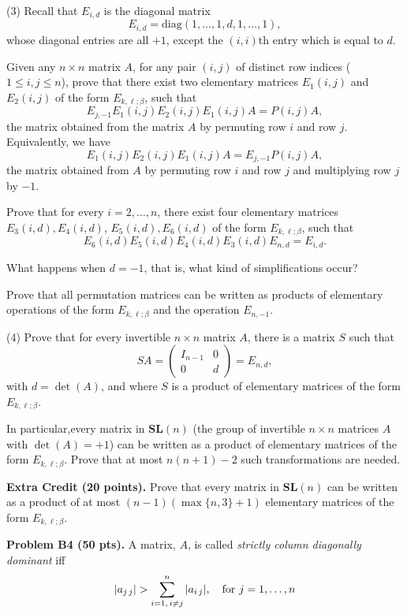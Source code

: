 \documentclass[12pt]{article}
\begin{document}
\medskip
(3)
Recall that $E_{i, d}$ is  the diagonal matrix
\[
E_{i, d} = \mathrm{diag}(1,\ldots, 1, d, 1, \ldots,  1),
\]
whose diagonal entries are all $+1$, except the $(i, i)$th entry which
is equal to $d$.

\medskip
Given any $n\times n$ matrix $A$, for any pair $(i, j)$ of distinct
row indices ($1 \leq i, j \leq n$), 
prove that there exist two elementary matrices $E_1(i,j)$ and $E_2(i,j)$
of the form $E_{k,\ell; \beta}$, 
such that
\[
E_{j,-1} E_1(i,j)E_2(i,j)E_1(i,j) A = P(i, j) A,
\]
the matrix obtained from the matrix $A$ by permuting row $i$ and row $j$.
Equivalently, we have
\[
 E_1(i,j)E_2(i,j)E_1(i,j) A = E_{j,-1}P(i, j) A,
\]
the matrix obtained from $A$ by permuting row $i$ and row $j$ and
multiplying row $j$ by $-1$.

\medskip
Prove that for every $i = 2, \ldots, n$, there exist four elementary matrices
$E_3(i,d), E_4(i,d)$, $E_5(i,d), E_6(i,d)$  of the form $E_{k,\ell; \beta}$, 
such that
\[
E_6(i,d)E_5(i,d)E_4(i,d)E_3(i,d) E_{n,d} = E_{i, d}.
\]

What happens when $d = -1$, that is, what kind of simplifications occur?


\medskip
Prove that all permutation matrices can be written as products
of elementary operations of the form  $E_{k,\ell; \beta}$ 
and the operation $E_{n, -1}$.

\medskip
(4)
Prove that for every invertible $n\times n$ matrix $A$, there is
a matrix $S$ such that
\[
S A = 
\begin{pmatrix}
I_{n - 1} & 0 \\
0 & d
\end{pmatrix}
= E_{n, d},
\]
with $d = \det(A)$, and where $S$ is a product of elementary 
matrices of the form  $E_{k,\ell; \beta}$.

\medskip
In particular,every matrix in $\mathbf{SL}(n)$
(the group of invertible $n\times n$ matrices $A$ with
$\det(A) = +1$) can be written as a product of
elementary 
matrices of the form  $E_{k,\ell; \beta}$.
Prove that at most $n(n + 1) - 2$ such transformations are needed.

\vspace {0.25cm}\noindent
{\bf Extra Credit (20 points).}
Prove that every matrix in $\mathbf{SL}(n)$
can be written as a product of at most
$(n  - 1)(\max\{n, 3\} + 1)$
elementary   matrices of the form  $E_{k,\ell; \beta}$.


\vspace {0.25cm}\noindent
{\bf Problem B4 (50 pts).}
A matrix, $A$, is called {\it strictly column diagonally dominant\/}
iff
\[
|a_{j\, j}| > \sum_{i = 1,\, i\not= j}^{n} |a_{i\, j}|,
\quad\hbox{for $j = 1, \ldots, n$}
\]
\end{document}
